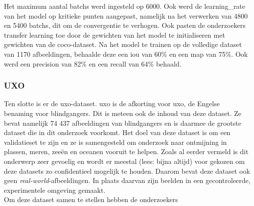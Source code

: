 Het maximum aantal \glspl{batch} werd ingesteld op 6000. Ook werd de \gls{learning_rate} van het model op kritieke punten aangepast, namelijk na het verwerken van 4800 en 5400 \glspl{batch}, dit om de convergentie te verhogen. Ook pasten de onderzoekers transfer learning toe door de gewichten van het model te initialiseren met gewichten van de \gls{coco}-dataset. Na het model te trainen op de volledige dataset van 1170 afbeeldingen, behaalde deze een \gls{iou} van 60\% en een \gls{map} van 75\%. Ook werd een \gls{precision} van 82\% en een \gls{recall} van 64\% behaald. \autocite{Pessanha_Santos_2024}

\subsubsection{UXO}

Ten slotte is er de \acrshort{uxo}-dataset. \acrshort{uxo} is de afkorting voor \acrlong{uxo}, de Engelse benaming voor \glspl{blindganger}. Dit is meteen ook de inhoud van deze dataset. Ze bevat namelijk 74 437 afbeeldingen van \glspl{blindganger} en is daarmee de grootste dataset die in dit onderzoek voorkomt. Het doel van deze dataset is om een validatieset te zijn en ze is samengesteld om onderzoek naar ontmijning in plassen, meren, zeeën en oceanen vooruit te helpen. Zoals al eerder vermeld is dit onderwerp zeer gevoelig en wordt er meestal (lees: bijna altijd) voor gekozen om deze datasets zo confidentieel mogelijk te houden. Daarom bevat deze dataset ook geen \emph{real-world}-afbeeldingen. In plaats daarvan zijn beelden in een gecontroleerde, experimentele omgeving gemaakt. \\

Om deze dataset samen te stellen hebben de onderzoekers 